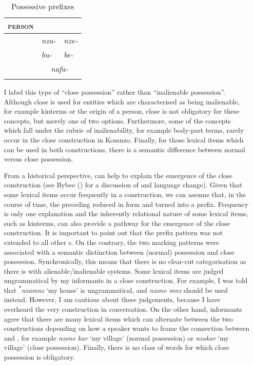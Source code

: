 \begin{table}[H]
\caption{Possessive prefixes} 
\label{posspref}
	\begin{tabularx}{\textwidth}{Xll}
		\lsptoprule
		\textsc{person}	&\Sg&\Nsg\\ \midrule
		\First{}&\emph{nzu-}&\emph{nze-}\\
		\Second{}&\emph{bu-}&\emph{be-}\\
		\Third&\multicolumn{2}{c}{\emph{nafa-}\hfill{ }}\\
		\lspbottomrule
	\end{tabularx}	
\end{table}%

I label this type of  ``close possession'' rather than ``inalienable possession''. Although close  is used for entities which are characterised as being inalienable, for example kinterms or the origin of a person, close  is not obligatory for these concepts, but merely one of two options. Furthermore, some of the concepts which fall under the rubric of inalienability, for example body-part terms, rarely occur in the close  construction in Komnzo. Finally, for those lexical items which can be used in both  constructions, there is a semantic difference between normal versus close possession.%

From a historical perspective,  can help to explain the emergence of the close  construction (see Bybee (\citeyear[142]{Bybee:2010wb}) for a discussion of  and language change). Given that some lexical items occur frequently in a  construction, we can assume that, in the course of time, the preceding  reduced in form and turned into a prefix. Frequency is only one explanation and the inherently relational nature of some lexical items, such as kinterms, can also provide a pathway for the emergence of the close  construction. It is important to point out that the prefix pattern was not extended to all other s. On the contrary, the two marking patterns were associated with a semantic distinction between (normal) possession and close possession. Synchronically, this means that there is no clear-cut categorisation as there is with alienable/inalienable systems. Some lexical items are judged ungrammatical by my informants in a close  construction. For example, I was told that \textsuperscript{$\ast$}\emph{nzumnz} `my house' is ungrammatical, and \emph{nzone mnz} should be used instead. However, I am cautious about these judgements, because I have overheard the very construction in conversation. On the other hand, informants agree that there are many lexical items which can alternate between the two  constructions depending on how a speaker wants to frame the connection between  and , for example \emph{nzone kar} `my village' (normal possession) or \emph{nzukar} `my village' (close possession). Finally, there is no class of words for which close possession is obligatory.%

